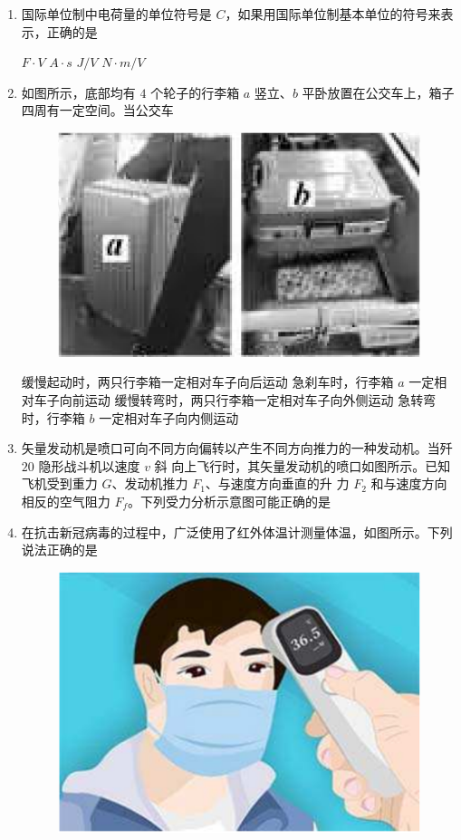 
\gaokaoxz

\begin{enumerate}
\item
国际单位制中电荷量的单位符号是 $ C $，如果用国际单位制基本单位的符号来表示，正确的是  

\fourchoices
{$ F \cdot V $}
{$ A \cdot s $}
{$ J/V $}
{$ N \cdot m/V $}


\item
如图所示，底部均有 $ 4 $ 个轮子的行李箱 $ a $ 竖立、$ b $ 平卧放置在公交车上，箱子四周有一定空间。当公交车  
\begin{figure}[h!]
\centering
\includegraphics[width=0.23\linewidth]{picture/screenshot041}
\end{figure}

\fourchoices
{缓慢起动时，两只行李箱一定相对车子向后运动}
{急刹车时，行李箱 $ a $ 一定相对车子向前运动}
{缓慢转弯时，两只行李箱一定相对车子向外侧运动}
{急转弯时，行李箱 $ b $ 一定相对车子向内侧运动}


\item
矢量发动机是喷口可向不同方向偏转以产生不同方向推力的一种发动机。当歼 $ 20 $ 隐形战斗机以速度 $ v $ 斜
向上飞行时，其矢量发动机的喷口如图所示。已知飞机受到重力 $ G $、发动机推力 $ F_{1} $、与速度方向垂直的升
力 $ F_{2} $ 和与速度方向相反的空气阻力 $ F_{f} $。下列受力分析示意图可能正确的是  
\begin{figure}[h!]
\centering
 
\end{figure}

\pfourchoices
{}
{}
{}
{}





\item
在抗击新冠病毒的过程中，广泛使用了红外体温计测量体温，如图所示。下列说法正确的是  
\begin{figure}[h!]
\centering
\includegraphics[width=0.2\linewidth]{picture/screenshot043}
\end{figure}



\end{enumerate}
